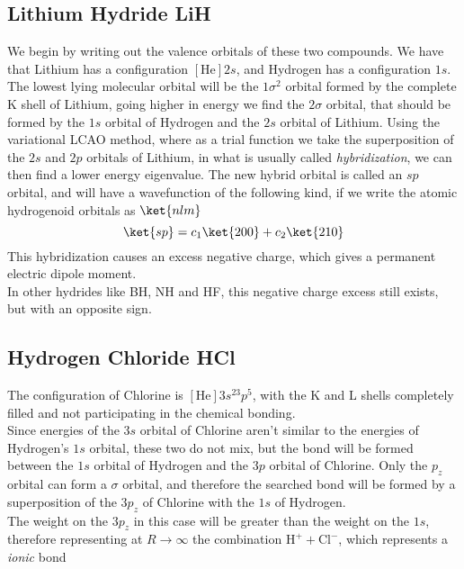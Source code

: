 \documentclass[a4paper, 11pt]{book}
\newcommand{\1}{\opr{\mathds{1}}}
\theoremstyle{plain}
\begin{document}
	\subsection{Lithium Hydride LiH}
	We begin by writing out the valence orbitals of these two compounds. We have that Lithium has a configuration $[\mathrm{He}]2s$, and Hydrogen has a configuration $1s$. The lowest lying molecular orbital will be the $1\sigma^2$ orbital formed by the complete K shell of Lithium, going higher in energy we find the $2\sigma$ orbital, that should be formed by the $1s$ orbital of Hydrogen and the $2s$ orbital of Lithium. Using the variational LCAO method, where as a trial function we take the superposition of the $2s$ and $2p$ orbitals of Lithium, in what is usually called \textit{hybridization}, we can then find a lower energy eigenvalue. The new hybrid orbital is called an $sp$ orbital, and will have a wavefunction of the following kind, if we write the atomic hydrogenoid orbitals as $\ket{nlm}$
	\begin{equation}
		\ket{sp}=c_1\ket{200}+c_2\ket{210}
		\label{eq:sporbital}
	\end{equation}
	This hybridization causes an excess negative charge, which gives a permanent electric dipole moment.\\
	In other hydrides like BH, NH and HF, this negative charge excess still exists, but with an opposite sign.
	\subsection{Hydrogen Chloride HCl}
	The configuration of Chlorine is $[\mathrm{He}]3s^23p^5$, with the K and L shells completely filled and not participating in the chemical bonding.\\
	Since energies of the $3s$ orbital of Chlorine aren't similar to the energies of Hydrogen's $1s$ orbital, these two do not mix, but the bond will be formed between the $1s$ orbital of Hydrogen and the $3p$ orbital of Chlorine. Only the $p_z$ orbital can form a $\sigma$ orbital, and therefore the searched bond will be formed by a superposition of the $3p_z$ of Chlorine with the $1s$ of Hydrogen.\\
	The weight on the $3p_z$ in this case will be greater than the weight on the $1s$, therefore representing at $R\to\infty$ the combination $\mathrm{H}^++\mathrm{Cl}^-$, which represents a \textit{ionic} bond
\end{document}
